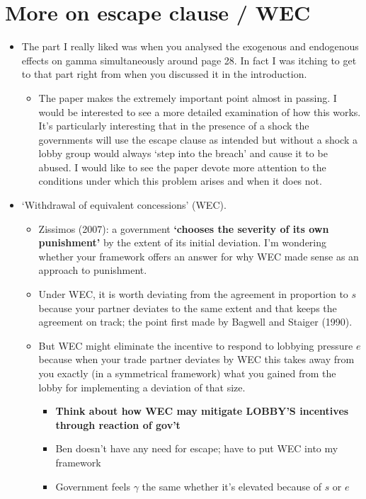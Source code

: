 \documentclass[12pt]{article}
\newcommand{\ga}{\gamma}
\begin{document}
\section{More on escape clause / WEC}
		\begin{itemize}
			\item The part I really liked was when you analysed the exogenous and endogenous effects on gamma simultaneously around page 28.  In fact I was itching to get to that part right from when you discussed it in the introduction.  
				\begin{itemize}
					\item The paper makes the extremely important point almost in passing.  I would be interested to see a more detailed examination of how this works.  It's particularly interesting that in the presence of a shock the governments will use the escape clause as intended but without a shock a lobby group would always `step into the breach' and cause it to be abused.  I would like to see the paper devote more attention to the conditions under which this problem arises and when it does not.
				\end{itemize}
			\item `Withdrawal of equivalent concessions' (WEC).
				\begin{itemize}
					\item Zissimos (2007): a government \textbf{`chooses the severity of its own punishment'} by the extent of its initial deviation. I'm wondering whether your framework offers an answer for why WEC made sense as an approach to punishment.
					\item Under WEC, it is worth deviating from the agreement in proportion to $s$ because your partner deviates to the same extent and that keeps the agreement on track; the point first made by Bagwell and Staiger (1990).
					\item But WEC might eliminate the incentive to respond to lobbying pressure $e$ because when your trade partner deviates by WEC this takes away from you exactly (in a symmetrical framework) what you gained from the lobby for implementing a deviation of that size.
						\begin{itemize}
							\item \textbf{Think about how WEC may mitigate LOBBY'S incentives through reaction of gov't}
							\item Ben doesn't have any need for escape; have to put WEC into my framework
							\item Government feels $\ga$ the same whether it's elevated because of $s$ or $e$

\end{itemize}
\end{itemize}
\end{itemize}
\end{document}
